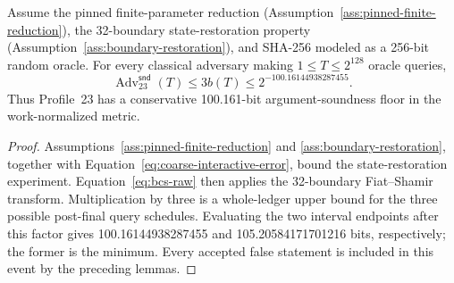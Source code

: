 \begin{theorem}
\label{thm:bcs-soundness}
Assume the pinned finite-parameter reduction
(Assumption~\ref{ass:pinned-finite-reduction}), the 32-boundary
state-restoration property (Assumption~\ref{ass:boundary-restoration}), and
SHA-256 modeled as a 256-bit random oracle.  For every classical adversary making
\(1\le T\le2^{128}\) oracle queries,
\[
 \operatorname{Adv}^{\mathsf{snd}}_{23}(T)
 \le 3b(T)\le 2^{-100.16144938287455}.
\]
Thus Profile~23 has a conservative 100.161-bit argument-soundness floor in
the work-normalized metric.
\end{theorem}

\begin{proof}
Assumptions~\ref{ass:pinned-finite-reduction} and
\ref{ass:boundary-restoration}, together with
Equation~\eqref{eq:coarse-interactive-error}, bound the state-restoration
experiment.  Equation~\eqref{eq:bcs-raw} then applies the 32-boundary
Fiat--Shamir transform.
Multiplication by three is a whole-ledger upper bound for the three possible
post-final query schedules.  Evaluating the two interval endpoints after this
factor gives 100.16144938287455 and 105.20584171701216 bits, respectively;
the former is the minimum.  Every accepted false statement is included in
this event by the preceding lemmas.
\end{proof}
